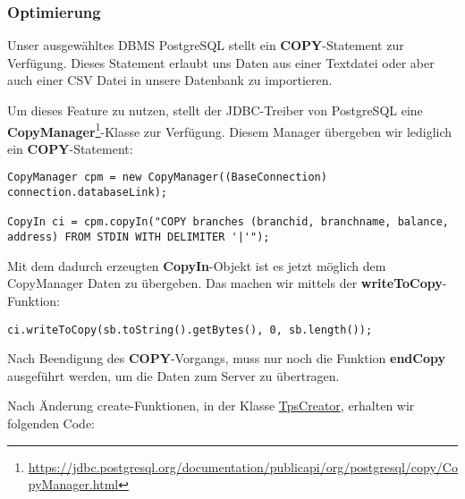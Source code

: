 \subsubsection*{Optimierung}
Unser ausgewähltes DBMS PostgreSQL stellt ein \textbf{COPY}-Statement zur
Verfügung. Dieses Statement erlaubt uns Daten aus einer Textdatei oder aber auch
einer CSV Datei in unsere Datenbank zu importieren. 

Um dieses Feature zu nutzen, stellt der JDBC-Treiber von PostgreSQL eine
\textbf{CopyManager}\footnote{\url{https://jdbc.postgresql.org/documentation/publicapi/org/postgresql/copy/CopyManager.html}}-Klasse
zur Verfügung. Diesem Manager übergeben wir lediglich ein
\textbf{COPY}-Statement:

\begin{lstlisting}[caption={Initialisierung des CopyManagers},numbers=none]
CopyManager cpm = new CopyManager((BaseConnection) connection.databaseLink);

CopyIn ci = cpm.copyIn("COPY branches (branchid, branchname, balance, address) FROM STDIN WITH DELIMITER '|'");
\end{lstlisting}

Mit dem dadurch erzeugten \textbf{CopyIn}-Objekt ist es jetzt möglich dem CopyManager Daten zu
übergeben.
Das machen wir mittels der \textbf{writeToCopy}-Funktion:

\begin{lstlisting}[caption={WriteToCopy-Funktion},numbers=none]
ci.writeToCopy(sb.toString().getBytes(), 0, sb.length());
\end{lstlisting}

Nach Beendigung des \textbf{COPY}-Vorgangs, muss nur noch die Funktion
\textbf{endCopy} ausgeführt werden, um die Daten zum Server zu übertragen.

Nach Änderung create-Funktionen, in der Klasse
\hyperref[lst:tpsv2]{TpsCreator}, erhalten wir folgenden Code:

